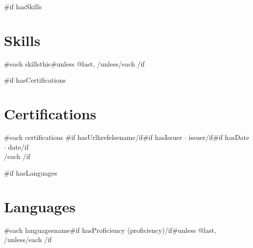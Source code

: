 \documentclass[10.5pt,a4paper]{article}
\begin{document}
{{#if hasSkills}}
\section{Skills}
{{#each skills}}{{this}}{{#unless @last}}, {{/unless}}{{/each}}
{{/if}}

{{#if hasCertifications}}
\section{Certifications}
{{#each certifications}}
{{#if hasUrl}}{{href}}{{else}}{{name}}{{/if}}{{#if hasIssuer}} $\cdot$ {{issuer}}{{/if}}{{#if hasDate}} $\cdot$ {{date}}{{/if}}\\
{{/each}}
{{/if}}

{{#if hasLanguages}}
\section{Languages}
{{#each languages}}{{name}}{{#if hasProficiency}} ({{proficiency}}){{/if}}{{#unless @last}}, {{/unless}}{{/each}}
{{/if}}
\end{document}
